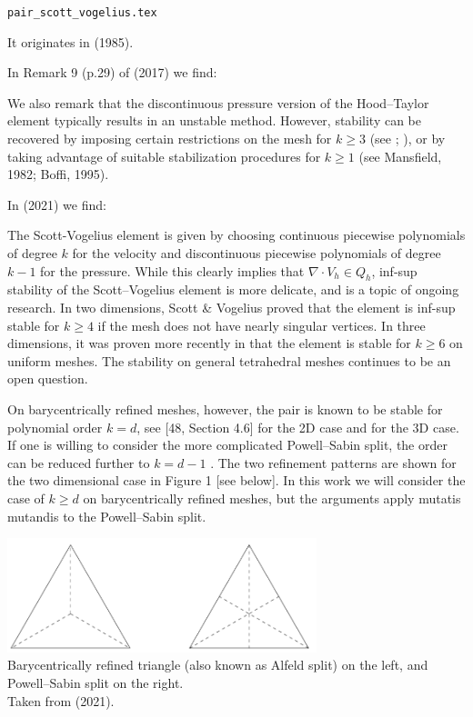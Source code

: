 \begin{flushright} {\tiny {\color{gray} \tt pair\_scott\_vogelius.tex}} \end{flushright}

It originates in  (1985). 

 
In Remark 9 (p.29) of \textcite{aubb17} (2017) we find: 
\begin{displayquote}
{\color{darkgray}
We also remark that the discontinuous
pressure version of the Hood–Taylor element typically
results in an unstable method. However, stability can be
recovered by imposing certain restrictions on the mesh for
$k \ge 3$ (see \cite{voge83}; \cite{scvo85}), or
by taking advantage of suitable stabilization procedures for
$k\ge 1$ (see Mansfield, 1982; Boffi, 1995).
}
\end{displayquote}

In \textcite{fams21} (2021) we find:
\begin{displayquote}
{\color{darkgray}
The Scott-Vogelius element is given by choosing continuous piecewise 
polynomials of degree $k$ for the velocity and discontinuous piecewise 
polynomials of degree $k-1$ for the pressure. While this clearly
implies that $\nabla\cdot V_h \in Q_h$, inf-sup stability of the 
Scott–Vogelius element is more delicate, and is a topic of ongoing research. 
In two dimensions, Scott \& Vogelius proved \cite{scvo85} that the element is inf-sup
stable for $k\ge 4$ if the mesh does not have nearly singular vertices. 
In three dimensions, it was proven more recently in \cite{zhan11b} 
that the element is stable for $k\ge 6$ on uniform meshes. The stability on general
tetrahedral meshes continues to be an open question.

On barycentrically refined meshes, however, the pair is known to 
be stable for polynomial order
$k = d$, see [48, Section 4.6] for the 2D case and 
\cite{zhan05} for the 3D case. If one is willing to 
consider the more complicated Powell–Sabin split, the order 
can be reduced further to $k=d-1$ \cite{zhan08,zhan11a}. The two
refinement patterns are shown for the two dimensional case 
in Figure 1 [see below]. In this work we will consider
the case of $k \ge d$ on barycentrically refined meshes, but 
the arguments apply mutatis mutandis to the Powell–Sabin split.
}
\end{displayquote}

\begin{center}
\includegraphics[width=9cm]{images/pair_scott_vogelius/scottvogelius_split}\\
{\captionfont 
Barycentrically refined triangle (also known as Alfeld split) on the left,
and Powell–Sabin split on the right.\\ Taken from \textcite{fams21} (2021).}
\end{center}

